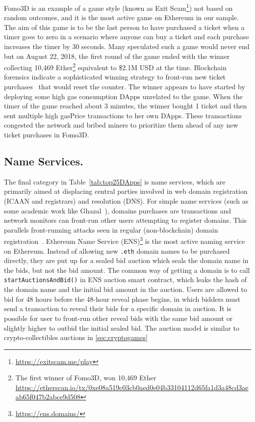 \textsf{Fomo3D} is an example of a game style (known as \textsf{Exit Scam}\footnote{\url{https://exitscam.me/play}}) not based on random outcomes, and it is the most active game on Ethereum in our sample. The aim of this game is to be the last person to have purchased a ticket when a timer goes to zero in a scenario where anyone can buy a ticket and each purchase increases the timer by 30 seconds. Many speculated such a game would never end but on August 22, 2018, the first round of the game ended with the winner collecting 10,469 Ether\footnote{The first winner of Fomo3D, won 10,469 Ether \url{ https://etherscan.io/tx/0xe08a519c03cb0aed0e04b33104112d65fa1d3a48cd3aeab65f047b2abce9d508}} equivalent to \$2.1M USD at the time. 
Blockchain forensics indicate a sophisticated winning strategy to front-run new ticket purchases~\cite{fomo3dhacker} that would reset the counter. The winner appears to have started by deploying some high gas consumption DApps unrelated to the game. When the timer of the game reached about 3 minutes, the winner bought 1 ticket and then sent multiple high gasPrice transactions to her own DApps. These transactions congested the network and bribed miners to prioritize them ahead of any new ticket purchases in \textsf{Fomo3D}. 




\subsection{Name Services.}\label{sec:ens}

The final category in Table~\ref{tab:top25DApps} is name services, which are primarily aimed at displacing central parties involved in web domain registration (\eg ICAAN and registrars) and resolution (\eg DNS). For simple name services (such as some academic work like Ghazal~\cite{moosavighazal}), domains purchases are transactions and network monitors can front-run other users attempting to register domains. This parallels front-running attacks seen in regular (non-blockchain) domain registration~\cite{sac022en33:online}. \textsf{Ethereum Name Service (ENS)}\footnote{\url{https://ens.domains/}} is the most active naming service on Ethereum. Instead of allowing new \texttt{.eth} domain names to be purchased directly, they are put up for a sealed bid auction which seals the domain name in the bids, but not the bid amount. The common way of getting a domain is to call \texttt{startAuctionsAndBid()} in ENS auction smart contract, which leaks the hash of the domain name and the initial bid amount in the auction. Users are allowed to bid for 48 hours before the 48-hour reveal phase begins, in which bidders must send a transaction to reveal their bids for a specific domain in auction. It is possible for user to front-run other reveal bids with the same bid amount or slightly higher to outbid the initial sealed bid. The auction model is similar to crypto-collectibles auctions in \ref{sec:cryptogames}

